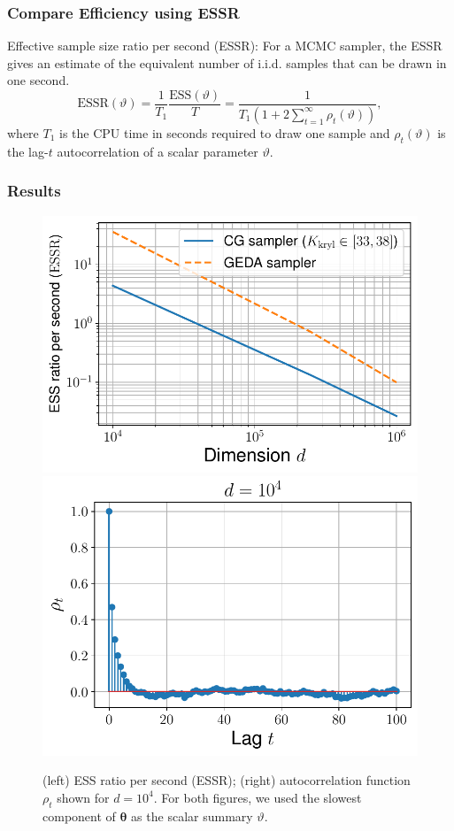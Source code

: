 \documentclass[aspectratio=169]{beamer}
\newcommand{\Bs}[1]{\boldsymbol{#1}} %
\newcommand{\pr}[1]{\left(#1\right)} %
\begin{document}
\begin{frame}
  \frametitle{Compare Efficiency using ESSR}
  Effective sample size ratio per second (ESSR): For a MCMC sampler, the ESSR gives an estimate of the equivalent number of i.i.d. samples that can be drawn in one second.
  \[  \text{ESSR}(\vartheta) = \dfrac{1}{T_1}\dfrac{\text{ESS}(\vartheta)}{T} =  \dfrac{1}{T_1\pr{1 + 2 \displaystyle\sum_{t=1}^\infty \rho_t(\vartheta)}},\]
  where $T_1$ is the CPU time in seconds required to draw one sample and $\rho_t(\vartheta)$ is the lag-$t$ autocorrelation of a scalar parameter $\vartheta$.
\end{frame}

\begin{frame}
  \frametitle{Results}
  \begin{figure}
    \mbox{{\includegraphics[scale=0.45]{src/images/simu3_ESS_bis.pdf}}}
    \mbox{{\includegraphics[scale=0.45]{src/images/simu3_acf.pdf}}}
    \caption{(left) ESS ratio per second (ESSR); (right) autocorrelation function $\rho_t$ shown for $d=10^4$.
    For both figures, we used the slowest component of $\Bs{\theta}$ as the scalar summary $\vartheta$.}
  \label{fig:scenario_3_results}
  \end{figure}
\end{frame}
\end{document}

